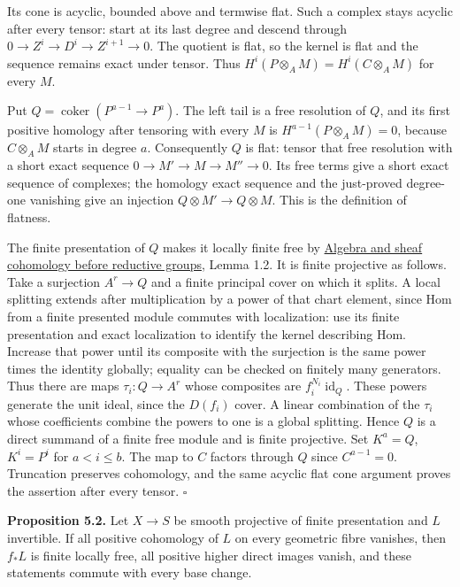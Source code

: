 \documentclass[11pt,a4paper,openany]{report}
\begin{document}
Its cone is acyclic, bounded above and termwise flat. Such a complex stays acyclic after every tensor: start at its last degree and descend through \(0\to Z^i\to D^i\to Z^{i+1}\to0\). The quotient is flat, so the kernel is flat and the sequence remains exact under tensor. Thus \(H^i(P\otimes_AM)=H^i(C\otimes_AM)\) for every \(M\).

Put \(Q=\operatorname{coker}(P^{a-1}\to P^a)\). The left tail is a free resolution of \(Q\), and its first positive homology after tensoring with every \(M\) is \(H^{a-1}(P\otimes_AM)=0\), because \(C\otimes_AM\) starts in degree \(a\). Consequently \(Q\) is flat: tensor that free resolution with a short exact sequence \(0\to M'\to M\to M''\to0\). Its free terms give a short exact sequence of complexes; the homology exact sequence and the just-proved degree-one vanishing give an injection \(Q\otimes M'\to Q\otimes M\). This is the definition of flatness.

The finite presentation of \(Q\) makes it locally finite free by \href{https://github.com/KokunoYumeto/open-math-courses/blob/main/docs/courses/AG-RG/AG-RG-S01.md}{Algebra and sheaf cohomology before reductive groups}, Lemma 1.2. It is finite projective as follows. Take a surjection \(A^r\to Q\) and a finite principal cover on which it splits. A local splitting extends after multiplication by a power of that chart element, since Hom from a finite presented module commutes with localization: use its finite presentation and exact localization to identify the kernel describing Hom. Increase that power until its composite with the surjection is the same power times the identity globally; equality can be checked on finitely many generators. Thus there are maps \(\tau_i:Q\to A^r\) whose composites are \(f_i^{N_i}\operatorname{id}_Q\). These powers generate the unit ideal, since the \(D(f_i)\) cover. A linear combination of the \(\tau_i\) whose coefficients combine the powers to one is a global splitting. Hence \(Q\) is a direct summand of a finite free module and is finite projective. Set \(K^a=Q\), \(K^i=P^i\) for \(a<i\leq b\). The map to \(C\) factors through \(Q\) since \(C^{a-1}=0\). Truncation preserves cohomology, and the same acyclic flat cone argument proves the assertion after every tensor. \(\square\)

\textbf{Proposition 5.2.} Let \(X\to S\) be smooth projective of finite presentation and \(L\) invertible. If all positive cohomology of \(L\) on every geometric fibre vanishes, then \(f_*L\) is finite locally free, all positive higher direct images vanish, and these statements commute with every base change.
\end{document}
